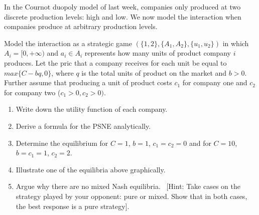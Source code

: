 \documentclass[../main.tex]{subfiles}
\begin{document}
\begin{question}
	In the Cournot duopoly model of last week, companies only produced at two discrete production levels: high and low. We now model the interaction when companies produce at arbitrary production levels.
	
	Model the interaction as a strategic game $(\{1,2\},\{A_1,A_2\},\{u_1,u_2\})$ in which $A_i = [0, +\infty)$ and $a_i \in A_i$ represents how many units of product company $i$ produces. Let the pric that a company receives for each unit be equal to $max\{C - bq, 0\}$, where $q$ is the total units of product on the market and $b > 0$. Further assume that producing a unit of product costs $c_1$ for company one and $c_2$ for company two ($c_1 > 0, c_2 > 0)$.
	
	\begin{enumerate}
	\item Write down the utility function of each company.
	\item Derive a formula for the PSNE analytically.
	\item Determine the equilibrium for $C = 1$, $b = 1$, $c_1 = c_2 = 0$ and for $C = 10$, $b = c_1 = 1$, $c_2 = 2$.
	\item Illustrate one of the equilibria above graphically.
	\item Argue why there are no mixed Nash equilibria. \
	[Hint: Take cases on the strategy played by your opponent: pure or mixed. Show that in both cases, the best response is a pure strategy].
	\end{enumerate}
\end{question}
\end{document}

